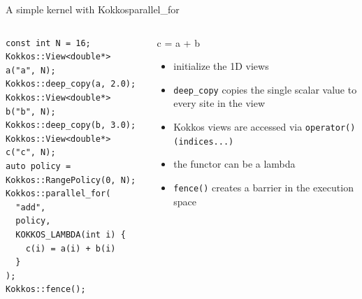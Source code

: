 \begin{frame}[fragile]{A simple kernel with Kokkos}{parallel\_for}
  \begin{columns}
      \begin{verbatim}
const int N = 16;
Kokkos::View<double*> a("a", N);
Kokkos::deep_copy(a, 2.0);
Kokkos::View<double*> b("b", N);
Kokkos::deep_copy(b, 3.0);
Kokkos::View<double*> c("c", N);
auto policy = Kokkos::RangePolicy(0, N);
Kokkos::parallel_for(
  "add",
  policy,
  KOKKOS_LAMBDA(int i) {
    c(i) = a(i) + b(i)
  }
);
Kokkos::fence();
      \end{verbatim}
      \begin{block}{c = a + b}
        \begin{itemize}
          \item initialize the 1D views
          \vspace{0.3cm}
          \item \verb|deep_copy| copies the single scalar value to every site in the view
          \vspace{0.3cm}
          \item Kokkos views are accessed via \verb|operator()(indices...)|
          \vspace{0.3cm}
          \item the functor can be a lambda
          \vspace{0.3cm}
          \item \verb|fence()| creates a barrier in the execution space
        \end{itemize}
      \end{block}
  \end{columns}
\end{frame}


